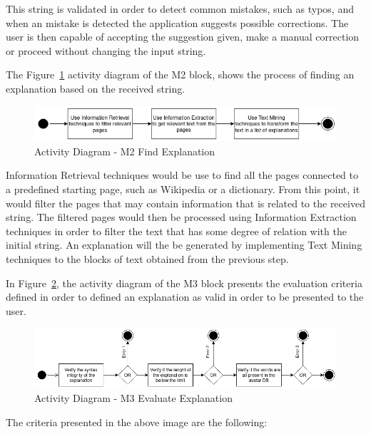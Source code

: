 This string is validated in order to detect common mistakes, such as typos, and when an mistake is detected the application suggests possible corrections.
The user is then capable of accepting the suggestion given, make a manual correction or proceed without changing the input string.

The Figure~\ref{fig:M2} activity diagram of the M2 block, shows the process of finding an explanation based on the received string.

\begin{figure}[H]
\centering
\includegraphics[width=\textwidth,keepaspectratio]{ch4/assets/M2.png}
\caption[Activity Diagram Find Explanation Module]{Activity Diagram - M2 Find Explanation}
\label{fig:M2}
\end{figure}

Information Retrieval techniques would be use to find all the pages connected to a predefined starting page, such as Wikipedia or a dictionary.
From this point, it would filter the pages that may contain information that is related to the received string.
The filtered pages would then be processed using Information Extraction techniques in order to filter the text that has some degree of relation with the initial string.
An explanation will the be generated by implementing Text Mining techniques to the blocks of text obtained from the previous step.

In Figure~\ref{fig:M3}, the activity diagram of the M3 block presents the evaluation criteria defined in order to defined an explanation as valid in order to be presented to the user.

\begin{figure}[H]
\centering
\includegraphics[width=\textwidth,keepaspectratio]{ch4/assets/M3.png}
\caption[Activity Diagram Evaluate Explanation Module]{Activity Diagram - M3 Evaluate Explanation}
\label{fig:M3}
\end{figure}

The criteria presented in the above image are the following:

